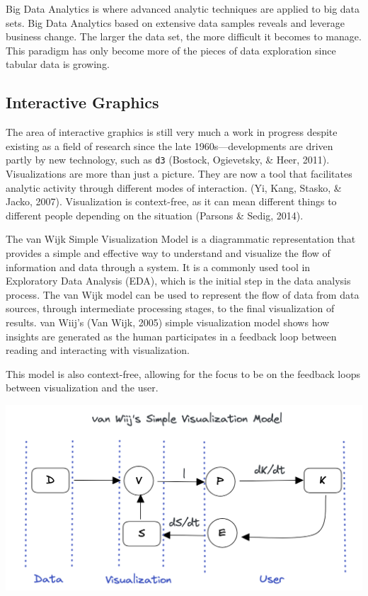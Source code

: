 \documentclass[print]{nuthesis}
\begin{document}
Big Data Analytics is where advanced analytic techniques are applied to big data sets. Big Data Analytics based on extensive data samples reveals and leverage business change. The larger the data set, the more difficult it becomes to manage. This paradigm has only become more of the pieces of data exploration since tabular data is growing.

\hypertarget{interactive-graphics}{%
\subsection{Interactive Graphics}\label{interactive-graphics}}

The area of interactive graphics is still very much a work in progress despite existing as a field of research since the late 1960s---developments are driven partly by new technology, such as \texttt{d3} (Bostock, Ogievetsky, \& Heer, 2011). Visualizations are more than just a picture. They are now a tool that facilitates analytic activity through different modes of interaction. (Yi, Kang, Stasko, \& Jacko, 2007). Visualization is context-free, as it can mean different things to different people depending on the situation (Parsons \& Sedig, 2014).

The van Wijk Simple Visualization Model is a diagrammatic representation that provides a simple and effective way to understand and visualize the flow of information and data through a system. It is a commonly used tool in Exploratory Data Analysis (EDA), which is the initial step in the data analysis process. The van Wijk model can be used to represent the flow of data from data sources, through intermediate processing stages, to the final visualization of results. van Wiij's (Van Wijk, 2005) simple visualization model shows how insights are generated as the human participates in a feedback loop between reading and interacting with visualization.

This model is also context-free, allowing for the focus to be on the feedback loops between visualization and the user.

\begin{center}
\includegraphics[width=\textwidth]{figure/vanWiijSimpleModel}
\end{center}
\end{document}
